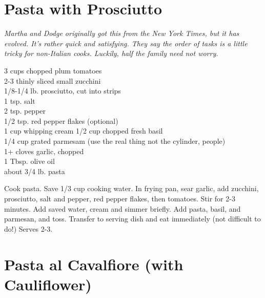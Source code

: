 \section{Pasta with Prosciutto}

\textit{Martha and Dodge originally got this from the New York Times,
but it has evolved. It's
rather quick and satisfying. They say the order of tasks is a little tricky for
non-Italian cooks. Luckily, half the family  need not worry.}
\begin{ingredients}
3 cups chopped plum tomatoes\\
2-3 thinly sliced small zucchini\\
1/8-1/4 lb. prosciutto, cut into strips\\
1 tsp. salt\\
2 tsp. pepper\\
1/2 tsp. red pepper flakes (optional)\\
1 cup whipping cream
1/2 cup chopped fresh basil\\
1/4 cup grated parmesam (use the real thing not the cylinder, people)\\
1+ cloves garlic, chopped\\
1 Tbsp. olive oil\\
about 3/4 lb. pasta 
\end{ingredients}
Cook pasta. Save 1/3 cup cooking water. In frying pan, sear garlic, add
zucchini, prosciutto, salt and pepper, red pepper flakes, then tomatoes.
Stir for 2-3 minutes.  Add saved water, cream and simmer briefly. Add
pasta, basil, and parmesan, and toss. Transfer to serving dish and eat
immediately (not difficult to do!) Serves 2-3.

\section{Pasta al Cavalfiore (with Cauliflower)
}


